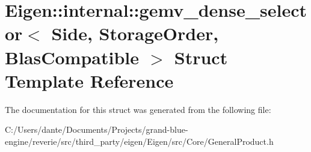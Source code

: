 \hypertarget{struct_eigen_1_1internal_1_1gemv__dense__selector}{}\section{Eigen\+::internal\+::gemv\+\_\+dense\+\_\+selector$<$ Side, Storage\+Order, Blas\+Compatible $>$ Struct Template Reference}
\label{struct_eigen_1_1internal_1_1gemv__dense__selector}


The documentation for this struct was generated from the following file\+:\begin{DoxyCompactItemize}
\item 
C\+:/\+Users/dante/\+Documents/\+Projects/grand-\/blue-\/engine/reverie/src/third\+\_\+party/eigen/\+Eigen/src/\+Core/General\+Product.\+h\end{DoxyCompactItemize}
